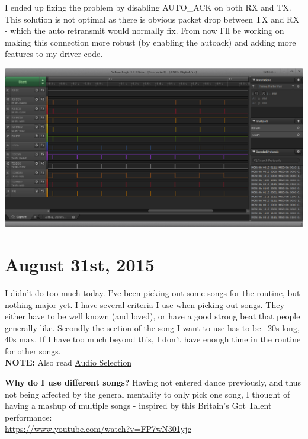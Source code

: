     		I ended up fixing the problem by disabling AUTO\_ACK on both RX and TX. This solution is not optimal as there is obvious packet drop between TX and RX - which the auto retransmit would normally fix. From now I'll be working on making this connection more robust (by enabling the autoack) and adding more features to my driver code.\\ 
    		
    		\centerline{\includegraphics[width=0.75\linewidth]{images/30_08_2015_PKT_DRP}}
    		\vspace{10pt}
    		
    	\section{August 31st, 2015}
    	
    		I didn't do too much today. I've been picking out some songs for the routine, but nothing major yet. I have several criteria I use when picking out songs. They either have to be well known (and loved), or have a good strong beat that people generally like. Secondly the section of the song I want to use has to be ~20s long, 40s max. If I have too much beyond this, I don't have enough time in the routine for other songs.\\
            
            \textbf{NOTE: }Also read \hyperref[sec:audio_selection]{Audio Selection}
    		
    		\textbf{Why do I use different songs?} Having not entered dance previously, and thus not being affected by the general mentality to only pick one song, I thought of having a mashup of multiple songs - inspired by this Britain's Got Talent performance:\\
    		
    		\url{https://www.youtube.com/watch?v=FP7wN301yjc}\\
    		
